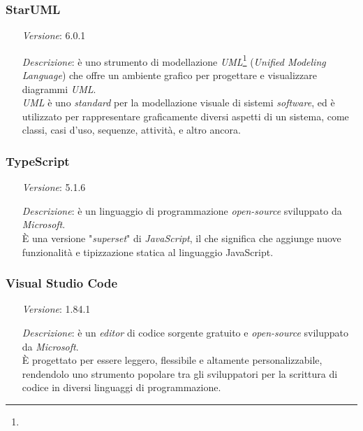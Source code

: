     \subsubsection*{StarUML}
    \begin{itemize}
        \item [\textit{Versione}:] 6.0.1
        \item [\textit{Descrizione}:] è uno strumento di modellazione \textit{UML}\footnote{} (\textit{Unified Modeling Language}) che offre un ambiente grafico per progettare e visualizzare diagrammi \textit{UML}. \\
                \textit{UML} è uno \textit{standard} per la modellazione visuale di sistemi \textit{software}, ed è utilizzato per rappresentare graficamente diversi aspetti di un sistema, come classi, casi d'uso, sequenze, attività, e altro ancora.
    \end{itemize}

    \subsubsection*{TypeScript}
    \begin{itemize}
        \item [\textit{Versione}:] 5.1.6
        \item [\textit{Descrizione}:] è un linguaggio di programmazione \textit{open-source} sviluppato da \textit{Microsoft}. \\
                È una versione "\textit{superset}" di \textit{JavaScript}, il che significa che aggiunge nuove funzionalità e tipizzazione statica al linguaggio JavaScript.
    \end{itemize}

    \subsubsection*{Visual Studio Code}
    \begin{itemize}
        \item [\textit{Versione}:] 1.84.1
        \item [\textit{Descrizione}:] è un \textit{editor} di codice sorgente gratuito e \textit{open-source} sviluppato da \textit{Microsoft}. \\
                È progettato per essere leggero, flessibile e altamente personalizzabile, rendendolo uno strumento popolare tra gli sviluppatori per la scrittura di codice in diversi linguaggi di programmazione.
    \end{itemize}


